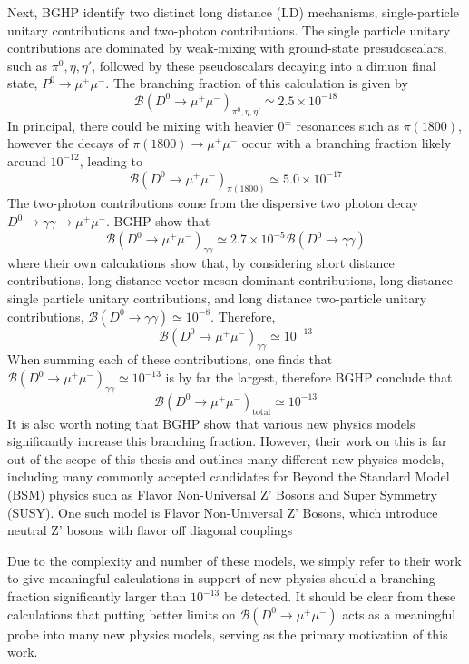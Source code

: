 Next, BGHP identify two distinct long distance (LD) mechanisms, single-particle unitary contributions and two-photon contributions. The single particle unitary contributions are dominated by weak-mixing with ground-state presudoscalars, such as $\pi^0, \eta, \eta'$, followed by these pseudoscalars decaying into a dimuon final state, $P^0 \to \mu^+ \mu^-$. The branching fraction of this calculation is given by
\begin{equation}
\mathcal{B}(D^0 \to \mu^+ \mu^-)_{\pi^0, \eta, \eta'} \simeq 2.5 \times 10^{-18}
\end{equation}
In principal, there could be mixing with heavier $0^\pm$ resonances such as $\pi(1800)$, however the decays of $\pi(1800) \to \mu^+\mu^-$ occur with a branching fraction likely around $10^{-12}$, leading to
\begin{equation}
\mathcal{B}(D^0 \to \mu^+ \mu^-)_{\pi(1800)} \simeq  5.0 \times 10^{-17}
\end{equation}
The two-photon contributions come from the dispersive two photon decay $D^0 \to \gamma \gamma \to \mu^+ \mu^-$. BGHP show that 
\begin{equation}
\mathcal{B}(D^0 \to \mu^+ \mu^-)_{\gamma\gamma} \simeq 2.7 \times 10^{-5} \mathcal{B}(D^0 \to \gamma\gamma)
\end{equation}
where their own calculations show that, by considering short distance contributions, long distance vector meson dominant contributions, long distance single particle unitary contributions, and long distance two-particle unitary contributions, $\mathcal{B}(D^0 \to \gamma\gamma) \simeq 10^{-8}$. Therefore, 
\begin{equation}
\mathcal{B}(D^0 \to \mu^+ \mu^-)_{\gamma\gamma} \simeq 10^{-13}
\end{equation}
When summing each of these contributions, one finds that $\mathcal{B}(D^0 \to \mu^+ \mu^-)_{\gamma\gamma} \simeq 10^{-13}$ is by far the largest, therefore BGHP conclude that
\begin{equation}
\mathcal{B}(D^0 \to \mu^+ \mu^-)_{\text{total}} \simeq 10^{-13}
\end{equation}
It is also worth noting that BGHP show that various new physics models significantly increase this branching fraction. However, their work on this is far out of the scope of this thesis and outlines many different new physics models, including many commonly accepted candidates for Beyond the Standard Model (BSM) physics such as Flavor Non-Universal Z' Bosons and Super Symmetry (SUSY). One such model is Flavor Non-Universal Z' Bosons, which introduce neutral Z' bosons with flavor off diagonal couplings 

Due to the complexity and number of these models, we simply refer to their work to give meaningful calculations in support of new physics should a branching fraction significantly larger than $10^{-13}$ be detected. It should be clear from these calculations that putting better limits on $\mathcal{B}(D^0 \to \mu^+ \mu^-)$ acts as a meaningful probe into many new physics models, serving as the primary motivation of this work. 